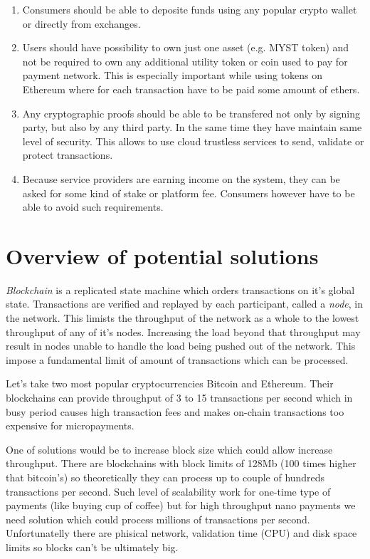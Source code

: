 \documentclass[a4paper,12pt]{article}
\begin{document}
\begin{enumerate}
    \begin{enumerate}
        \item Consumers should be able to deposite funds using any popular 
        crypto wallet or directly from exchanges.
        \item Users should have possibility to own just one asset (e.g. MYST
        token) and not be required to own any additional utility token or coin 
        used to pay for payment network. This is especially important while 
        using tokens on Ethereum where for each transaction have to be paid 
        some amount of ethers.
        \item Any cryptographic proofs should be able to be transfered not only
        by signing party, but also by any third party. In the same time they 
        have maintain same level of security. This allows to use cloud trustless
        services to send, validate or protect transactions.
        \item Because service providers are earning income on the system, they 
        can be asked for some kind of stake or platform fee. Consumers however 
        have to be able to avoid such requirements.
    \end{enumerate}
\end{enumerate}

\section{Overview of potential solutions}

\textit{Blockchain} is a replicated state machine which orders transactions on 
it's global state. Transactions are verified and replayed by each participant,
called a \textit{node}, in the network. This limists the throughput of the 
network as a whole to the lowest throughput of any of it's nodes. Increasing 
the load beyond that throughput may result in nodes unable to handle the load 
being pushed out of the network. This impose a fundamental limit of amount of 
transactions which can be processed. 

Let's take two most popular cryptocurrencies Bitcoin and Ethereum. Their 
blockchains can provide throughput of 3 to 15 transactions per second which in 
busy period causes high transaction fees and makes on-chain transactions too 
expensive for micropayments.

One of solutions would be to increase block size which could allow increase 
throughput. There are blockchains with block limits of 128Mb (100 times higher 
that bitcoin's) so theoretically they can process up to couple of hundreds 
transactions per second. Such level of scalability work for one-time type of 
payments (like buying cup of coffee) but for high throughput nano payments we 
need solution which could process millions of transactions per second. 
Unfortunatelly there are phisical network, validation time (CPU) and disk space 
limits so blocks can't be ultimately big.
\end{document}
